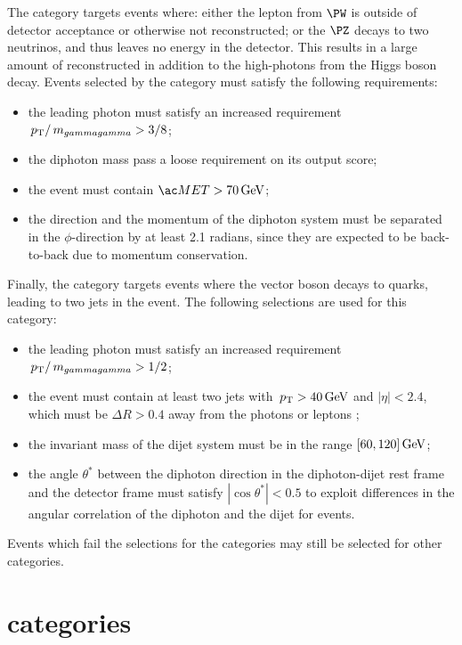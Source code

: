 The \VHMetTag category targets events where: either the lepton from $\PW$ is outside of detector acceptance or otherwise not reconstructed; or the $\PZ$ decays to two neutrinos, and thus leaves no energy in the detector. This results in a large amount of reconstructed \MET in addition to the high-\pT photons from the Higgs boson decay. Events selected by the \VHMetTag category must satisfy the following requirements:
\begin{itemize}
\item the leading photon must satisfy an increased requirement $\,p_\text{T}/\,m_{gammagamma} > 3/8$;
\item the diphoton mass pass a loose requirement on its \DiPhoBdt output score; %
\item the event must contain $\MET > 70\GeV$;
\item the \MET direction and the momentum of the diphoton system must be separated in the $\phi$-direction by at least 2.1 radians, since they are expected to be back-to-back due to momentum conservation.
\end{itemize}

Finally, the \VHHadronicTag category targets events where the vector boson decays to quarks, leading to two jets in the event. 
The following selections are used for this category:
\begin{itemize}
\item the leading photon must satisfy an increased requirement $\,p_\text{T}/\,m_{gammagamma} > 1/2$;
\item the event must contain at least two jets with $\,p_\text{T}>40\,\text{Ge\hspace{-.08em}V}$ and $|\eta|<2.4$, which must be $\Delta R >0.4$ away from the photons or leptons ;
\item the invariant mass of the dijet system must be in the range $[60,120]\,\text{Ge\hspace{-.08em}V}$;
\item the angle $\theta^{*}$ between the diphoton direction in the diphoton-dijet rest frame and the detector frame must satisfy $|\cos{\theta^{*}}| <0.5$ to exploit differences in the angular correlation of the diphoton and the dijet for \VH events.
\end{itemize}

Events which fail the selections for the \VHTag categories may still be selected for other categories.
\fi


\section{\TTHTag categories}
\label{cat:sec:tthtag}

